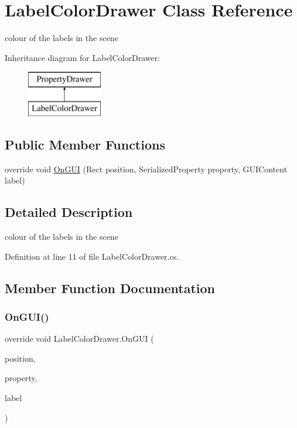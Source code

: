 \hypertarget{class_label_color_drawer}{}\section{Label\+Color\+Drawer Class Reference}
\label{class_label_color_drawer}


colour of the labels in the scene  


Inheritance diagram for Label\+Color\+Drawer\+:\begin{figure}[H]
\begin{center}
\leavevmode
\includegraphics[height=2.000000cm]{class_label_color_drawer}
\end{center}
\end{figure}
\subsection*{Public Member Functions}
\begin{DoxyCompactItemize}
\item 
override void \mbox{\hyperlink{class_label_color_drawer_aac4123bf5f51d339c77eaa6583a9a4ed}{On\+G\+UI}} (Rect position, Serialized\+Property property, G\+U\+I\+Content label)
\end{DoxyCompactItemize}


\subsection{Detailed Description}
colour of the labels in the scene 



Definition at line 11 of file Label\+Color\+Drawer.\+cs.



\subsection{Member Function Documentation}
\mbox{\label{class_label_color_drawer_aac4123bf5f51d339c77eaa6583a9a4ed}} 
\subsubsection{\texorpdfstring{On\+G\+U\+I()}{OnGUI()}}
{\footnotesize\ttfamily override void Label\+Color\+Drawer.\+On\+G\+UI (\begin{DoxyParamCaption}\item[{Rect}]{position,  }\item[{Serialized\+Property}]{property,  }\item[{G\+U\+I\+Content}]{label }\end{DoxyParamCaption})}



